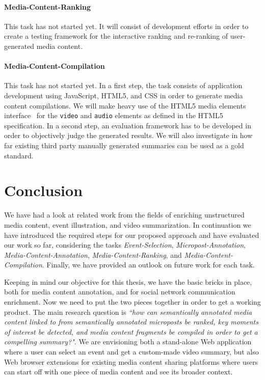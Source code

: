 \documentclass[runningheads,a4paper]{llncs}
\begin{document}
\paragraph{\bf{Media-Content-Ranking}}
This task has not started yet. It will consist of development efforts in order to create a testing framework for the interactive ranking and re-ranking of user-generated media content. 

\paragraph{\bf{Media-Content-Compilation}}
This task has not started yet. In a first step, the task consists of application development using JavaScript, HTML5, and CSS in order to generate media content compilations. We will make heavy use of the HTML5 media elements interface~\cite{mediaelements} for the \texttt{video} and \texttt{audio} elements as defined in the HTML5 specification. In a second step, an evaluation framework has to be developed in order to objectively judge the generated results. We will also investigate in how far existing third party manually generated summaries can be used as a gold standard.
 
\section{Conclusion}
We have had a look at related work from the fields of enriching unstructured media content, event illustration, and video summarization. In continuation we have introduced the required steps for our proposed approach and have evaluated our work so far, considering the tasks \emph{Event-Selection}, \emph{Micropost-Annotation}, \emph{Media-Content-Annotation}, \emph{Media-Content-Ranking}, and \emph{Media-Content-Compilation}. Finally, we have provided an outlook on future work for each task.

Keeping in mind our objective for this thesis, we have the basic bricks in place, both for media content annotation, and for social network communication enrichment. Now we need to put the two pieces together in order to get a working product. The main research question is \textit{``how can semantically annotated media content linked to from semantically annotated microposts be ranked, key moments of interest be detected, and media content fragments be compiled in order to get a compelling summary?"}. We are envisioning both a stand-alone Web application where a user can select an event and get a custom-made video summary, but also Web browser extensions for existing media content sharing platforms where users can start off with one piece of media content and see its broader context.



\end{document}
